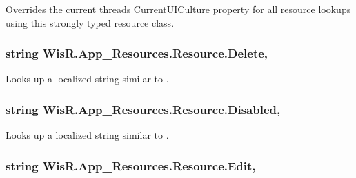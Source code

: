 Overrides the current thread\textquotesingle{}s Current\+U\+I\+Culture property for all resource lookups using this strongly typed resource class. 

\hypertarget{class_wis_r_1_1_app___resources_1_1_resource_a5441db4935202f789e69b51badd2664f}{}
\subsubsection[{Delete}]{\setlength{\rightskip}{0pt plus 5cm}string Wis\+R.\+App\+\_\+\+Resources.\+Resource.\+Delete\hspace{0.3cm}{\ttfamily [static]}, {\ttfamily [get]}}\label{class_wis_r_1_1_app___resources_1_1_resource_a5441db4935202f789e69b51badd2664f}


Looks up a localized string similar to . 

\hypertarget{class_wis_r_1_1_app___resources_1_1_resource_a5c92b3d50f5d6257774b9d9da8739fd2}{}
\subsubsection[{Disabled}]{\setlength{\rightskip}{0pt plus 5cm}string Wis\+R.\+App\+\_\+\+Resources.\+Resource.\+Disabled\hspace{0.3cm}{\ttfamily [static]}, {\ttfamily [get]}}\label{class_wis_r_1_1_app___resources_1_1_resource_a5c92b3d50f5d6257774b9d9da8739fd2}


Looks up a localized string similar to . 

\hypertarget{class_wis_r_1_1_app___resources_1_1_resource_a54c0b0eeef9600c4b44e26713c998d7b}{}
\subsubsection[{Edit}]{\setlength{\rightskip}{0pt plus 5cm}string Wis\+R.\+App\+\_\+\+Resources.\+Resource.\+Edit\hspace{0.3cm}{\ttfamily [static]}, {\ttfamily [get]}}\label{class_wis_r_1_1_app___resources_1_1_resource_a54c0b0eeef9600c4b44e26713c998d7b}


